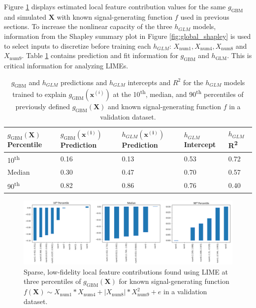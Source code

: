 \documentclass[sigconf]{acmart}
\begin{document}
Figure \ref{fig:lime} displays estimated local feature contribution values for the same $g_{\text{GBM}}$ and simulated $\mathbf{X}$ with known signal-generating function $f$ used in previous sections. To increase the nonlinear capacity of the three $h_{GLM}$ models, information from the Shapley summary plot in Figure \ref{fig:global_shapley} is used to select inputs to discretize before training each $h_{GLM}$: $X_{\text{num}1}, X_{\text{num}4}, X_{\text{num}8}$ and $X_{\text{num}9}$. Table \ref{tab:lime} contains prediction and fit information for $g_{\text{GBM}}$ and $h_{\text{GLM}}$. This is critical information for analyzing LIMEs.

\begin{table}[ht]
	\centering
	\caption{$g_{\text{GBM}}$ and $h_{GLM}$ predictions and $h_{GLM}$ intercepts and $R^2$ for the $h_{GLM}$ models trained to explain $g_{\text{GBM}}(\mathbf{x}^{(i)})$ at the 10\textsuperscript{th}, median, and 90\textsuperscript{th} percentiles of previously defined $g_{\text{GBM}}(\mathbf{X})$ and known signal-generating function $f$ in a validation dataset.} 
	\begin{tabular}{ | p{1.5cm} | p{1.5cm} | p{1.5cm} | p{1.5cm}| p{0.7cm} | }
	\hline
	$g_{\text{GBM}}(\mathbf{X})$\newline Percentile & $g_{\text{GBM}}(\mathbf{x^{(i)}})$\newline Prediction & $h_{GLM}(\mathbf{x^{(i)}})$\newline Prediction & $h_{GLM}$\newline Intercept & $h_{GLM}$ R\textsuperscript{2} \\ 
	\hline
	10\textsuperscript{th} & 0.16 & 0.13 & 0.53 & 0.72\\
	\hline	
	Median & 0.30 & 0.47 & 0.70 & 0.57\\
	\hline	
	90\textsuperscript{th} & 0.82 & 0.86 & 0.76 & 0.40\\
	\hline
	\end{tabular}
	\label{tab:lime}
\end{table}	

\begin{figure}[htb]
	\begin{center}
		\includegraphics[scale=0.54]{img/figure_5_lo.png}
		\caption{Sparse, low-fidelity local feature contributions found using LIME at three percentiles of $g_{\text{GBM}}(\mathbf{X})$ for known signal-generating function $f(\mathbf{X}) \sim X_{\text{num}1} * X_{\text{num}4} + |X_{\text{num}8}| * X_{\text{num}9}^2 + e$ in a validation dataset.}
		\label{fig:lime}
	\end{center}
\end{figure}
\end{document}
